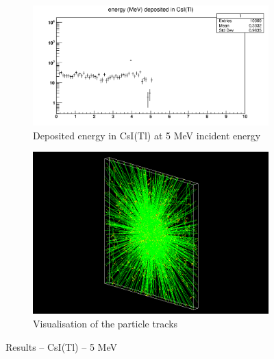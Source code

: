 \documentclass{article}
\begin{document}
\begin{figure}[H]
\centering
\begin{subfigure}{.5\textwidth}
  \centering
  \includegraphics[width=\linewidth]{images/task1/CsI_5MeV.png}
  \caption{Deposited energy in CsI(Tl) at 5 MeV incident energy}
\end{subfigure}%
\begin{subfigure}{.5\textwidth}
  \centering
  \includegraphics[width=\linewidth]{images/task1/CsI_5MeV_10000.png}
  \caption{Visualisation of the particle tracks}
\end{subfigure}
\caption{Results – CsI(Tl) – 5 MeV}
\end{figure}
\end{document}
